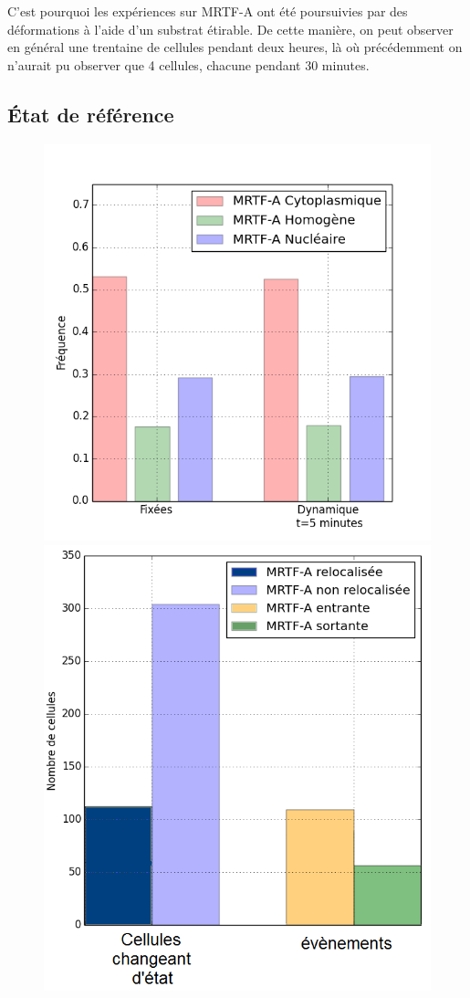 C'est pourquoi les expériences sur MRTF-A ont été poursuivies par des déformations à l'aide d'un substrat étirable. De cette manière, on peut observer en général une trentaine de cellules pendant deux heures, là où précédemment on n'aurait pu observer que 4 cellules, chacune pendant 30 minutes. 



\subsection{\'Etat de référence}
\begin{figure}
\includegraphics[scale=0.4]{Figures/Reference.png} 
\includegraphics[scale=0.32]{Figures/Reference_transloc.png} 

\end{figure}
